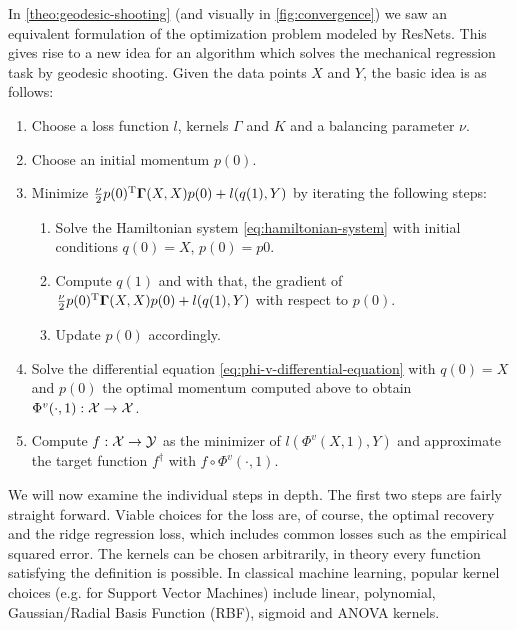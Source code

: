 In \cref{theo:geodesic-shooting} (and visually in \cref{fig:convergence}) we saw an equivalent formulation of the optimization problem modeled by ResNets.
This gives rise to a new idea for an algorithm which solves the mechanical regression task by geodesic shooting.
Given the data points $X$ and $Y$, the basic idea is as follows:
\begin{enumerate}[label=\arabic*.]
	\item Choose a loss function $l$, kernels $\Gamma$ and $K$ and a balancing parameter $\nu$.
	\item Choose an initial momentum $p(0)$.
	\item Minimize $\frac{\nu}{2} p(0)^{\mathrm{T}} \mathbf{\Gamma}(X, X)p(0) + l(q(1), Y)$ by iterating the following steps:
	\begin{enumerate}[label=\arabic*.]
		\item Solve the Hamiltonian system \ref{eq:hamiltonian-system} with initial conditions $q(0) = X$, $p(0) = p0$.
		\item Compute $q(1)$ and with that, the gradient of $\frac{\nu}{2} p(0)^{\mathrm{T}} \mathbf{\Gamma}(X, X)p(0) + l(q(1), Y)$ with respect to $p(0)$.
		\item Update $p(0)$ accordingly.
	\end{enumerate}
	\item Solve the differential equation \ref{eq:phi-v-differential-equation} with $q(0) = X$ and $p(0)$ the optimal momentum computed above to obtain $\Phi^v(\cdot, 1): \mathcal{X} \rightarrow \mathcal{X}$.
	\item Compute $f: \mathcal{X} \rightarrow \mathcal{Y}$ as the minimizer of $l(\Phi^v(X, 1), Y)$ and approximate the target function $f^\dagger$ with $f \circ \Phi^v(\cdot, 1)$.
\end{enumerate}

We will now examine the individual steps in depth.
The first two steps are fairly straight forward.
Viable choices for the loss are, of course, the optimal recovery and the ridge regression loss, which includes common losses such as the empirical squared error.
The kernels can be chosen arbitrarily, in theory every function satisfying the definition is possible.
In classical machine learning, popular kernel choices (e.g. for Support Vector Machines) include linear, polynomial, Gaussian/Radial Basis Function (RBF), sigmoid and ANOVA kernels.

